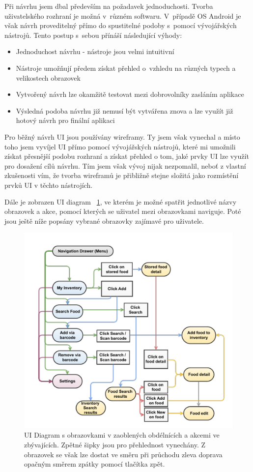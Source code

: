 \documentclass[thesis=B,czech]{FITthesis}[2013/10/20]
\begin{document}
Při návrhu jsem dbal především na požadavek jednoduchosti. Tvorba uživatelského rozhraní je možná v~různém softwaru. V~případě OS Android je však návrh proveditelný přímo do spustitelné podoby s~pomocí vývojářských nástrojů. Tento postup s~sebou přínáší následující výhody:

\begin{itemize}
  \item{Jednoduchost návrhu - nástroje jsou velmi intuitivní}
  \item{Nástroje umožňují předem získat přehled o~vzhledu na různých typech a velikostech obrazovek}
  \item{Vytvořený návrh lze okamžitě testovat mezi dobrovolníky zasláním aplikace}
  \item{Výsledná podoba návrhu již nemusí být vytvářena znova a lze využít již hotový návrh pro finální aplikaci}
\end{itemize}

Pro běžný návrh UI jsou používány wireframy. Ty jsem však vynechal a místo toho jsem vyvíjel UI přímo pomocí vývojářských nástrojů, které mi umožnili získat přesnější podobu rozhraní a získat přehled o tom, jaké prvky UI lze využít pro dosažení cílů návrhu. Tím jsem však vývoj nijak nezpomalil, neboť z vlastní zkušenosti vím, že tvorba wireframů je přibližně stejne složitá jako rozmístění prvků UI v těchto nástrojích.

Dále je zobrazen UI diagram ~\ref{fig:UIDiagram}, ve kterém je možné spatřit jednotlivé názvy obrazovek a akce, pomocí kterých se uživatel mezi obrazovkami naviguje. Poté jsou ještě níže popsány vybrané obrazovky zajímavé pro uživatele.

\begin{figure}[H]
  \centering
  \includegraphics[scale=0.70]{diagrams/ui.pdf}
  \caption{UI Diagram s obrazovkami v zaoblených obdélnících a akcemi ve zbývajících. Zpětné šipky jsou pro přehlednost vynechány. Z obrazovek se však lze dostat ve směru při průchodu zleva doprava opačným směrem zpátky pomocí tlačítka zpět.}
  \label{fig:UIDiagram}
\end{figure}
\end{document}
